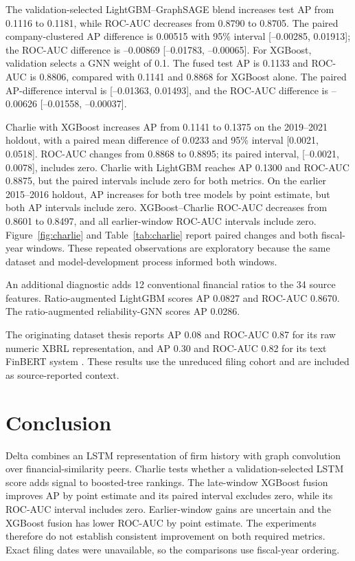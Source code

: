 \documentclass[conference]{IEEEtran}
\begin{document}
The validation-selected LightGBM--GraphSAGE blend increases test AP from 0.1116 to 0.1181, while ROC-AUC decreases from 0.8790 to 0.8705. The paired company-clustered AP difference is 0.00515 with 95\% interval [--0.00285, 0.01913]; the ROC-AUC difference is --0.00869 [--0.01783, --0.00065]. For XGBoost, validation selects a GNN weight of 0.1. The fused test AP is 0.1133 and ROC-AUC is 0.8806, compared with 0.1141 and 0.8868 for XGBoost alone. The paired AP-difference interval is [--0.01363, 0.01493], and the ROC-AUC difference is --0.00626 [--0.01558, --0.00037].

Charlie with XGBoost increases AP from 0.1141 to 0.1375 on the 2019--2021 holdout, with a paired mean difference of 0.0233 and 95\% interval [0.0021, 0.0518]. ROC-AUC changes from 0.8868 to 0.8895; its paired interval, [--0.0021, 0.0078], includes zero. Charlie with LightGBM reaches AP 0.1300 and ROC-AUC 0.8875, but the paired intervals include zero for both metrics. On the earlier 2015--2016 holdout, AP increases for both tree models by point estimate, but both AP intervals include zero. XGBoost--Charlie ROC-AUC decreases from 0.8601 to 0.8497, and all earlier-window ROC-AUC intervals include zero. Figure~\ref{fig:charlie} and Table~\ref{tab:charlie} report paired changes and both fiscal-year windows. These repeated observations are exploratory because the same dataset and model-development process informed both windows.

An additional diagnostic adds 12 conventional financial ratios to the 34 source features. Ratio-augmented LightGBM scores AP 0.0827 and ROC-AUC 0.8670. The ratio-augmented reliability-GNN scores AP 0.0286.

The originating dataset thesis reports AP 0.08 and ROC-AUC 0.87 for its raw numeric XBRL representation, and AP 0.30 and ROC-AUC 0.82 for its text FinBERT system \cite{potiriadis2026}. These results use the unreduced filing cohort and are included as source-reported context.

\section{Conclusion}
Delta combines an LSTM representation of firm history with graph convolution over financial-similarity peers. Charlie tests whether a validation-selected LSTM score adds signal to boosted-tree rankings. The late-window XGBoost fusion improves AP by point estimate and its paired interval excludes zero, while its ROC-AUC interval includes zero. Earlier-window gains are uncertain and the XGBoost fusion has lower ROC-AUC by point estimate. The experiments therefore do not establish consistent improvement on both required metrics. Exact filing dates were unavailable, so the comparisons use fiscal-year ordering.

\FloatBarrier


\end{document}
